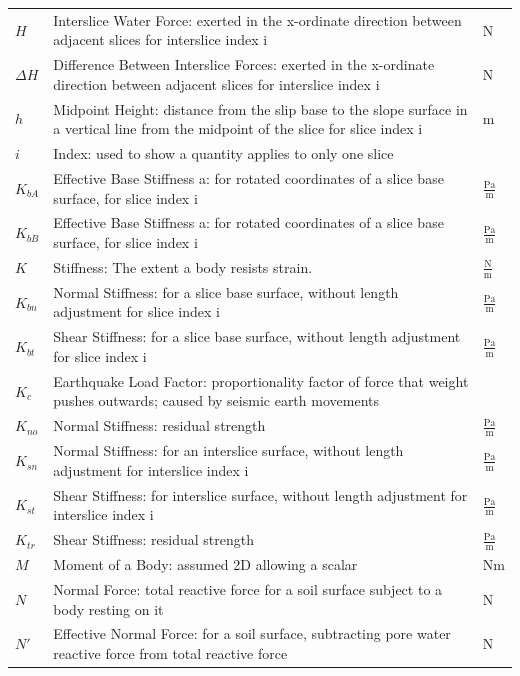 \documentclass[12pt]{article}
\begin{document}
\begin{longtabu}{l X[l] l}
\\
$H$ & Interslice Water Force: exerted in the x-ordinate direction between adjacent slices for interslice index i & N
\\
$\Delta{}H$ & Difference Between Interslice Forces: exerted in the x-ordinate direction between adjacent slices for interslice index i & N
\\
$h$ & Midpoint Height: distance from the slip base to the slope surface in a vertical line from the midpoint of the slice for slice index i & m
\\
$i$ & Index: used to show a quantity applies to only one slice & 
\\
${K_{bA}}$ & Effective Base Stiffness a: for rotated coordinates of a slice base surface, for slice index i & $\frac{\text{Pa}}{\text{m}}$
\\
${K_{bB}}$ & Effective Base Stiffness a: for rotated coordinates of a slice base surface, for slice index i & $\frac{\text{Pa}}{\text{m}}$
\\
$K$ & Stiffness: The extent a body resists strain. & $\frac{\text{N}}{\text{m}}$
\\
${K_{bn}}$ & Normal Stiffness: for a slice base surface, without length adjustment for slice index i & $\frac{\text{Pa}}{\text{m}}$
\\
${K_{bt}}$ & Shear Stiffness: for a slice base surface, without length adjustment for slice index i & $\frac{\text{Pa}}{\text{m}}$
\\
${K_{c}}$ & Earthquake Load Factor: proportionality factor of force that weight pushes outwards; caused by seismic earth movements & 
\\
${K_{no}}$ & Normal Stiffness: residual strength & $\frac{\text{Pa}}{\text{m}}$
\\
${K_{sn}}$ & Normal Stiffness: for an interslice surface, without length adjustment for interslice index i & $\frac{\text{Pa}}{\text{m}}$
\\
${K_{st}}$ & Shear Stiffness: for interslice surface, without length adjustment for interslice index i & $\frac{\text{Pa}}{\text{m}}$
\\
${K_{tr}}$ & Shear Stiffness: residual strength & $\frac{\text{Pa}}{\text{m}}$
\\
$M$ & Moment of a Body: assumed 2D allowing a scalar & Nm
\\
$N$ & Normal Force: total reactive force for a soil surface subject to a body resting on it & N
\\
$N'$ & Effective Normal Force: for a soil surface, subtracting pore water reactive force from total reactive force & N

\end{longtabu}
\end{document}
